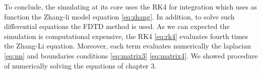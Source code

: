 \vspace{3.5em}

To conclude, the simulating at its core uses the RK4 for integration which uses as function the Zhang-li model equation \ref{eq:zhang}. In addition, to solve such differential equations the FDTD method is used. As we can expected the simulation is computational expensive, the RK4 \ref{eq:rk4} evaluates fourth times the Zhang-Li equation. Moreover, each term evaluates numerically the  laplacian \ref{eq:nn} and boundaries conditions \ref{eq:matrix3} \ref{eq:matrix4}. We showed procedure of numerically solving the equations of chapter 3.



